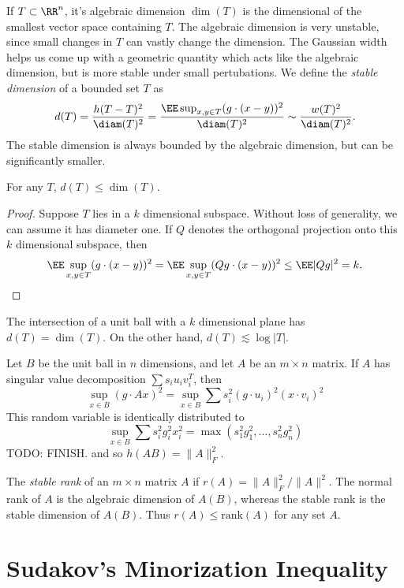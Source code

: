 If $T \subset \RR^n$, it's algebraic dimension $\dim(T)$ is the dimensional of the smallest vector space containing $T$. The algebraic dimension is very unstable, since small changes in $T$ can vastly change the dimension. The Gaussian width helps us come up with a geometric quantity which acts like the algebraic dimension, but is more stable under small pertubations. We define the {\it stable dimension} of a bounded set $T$ as
%
\[ d(T) = \frac{h(T-T)^2}{\diam(T)^2} = \frac{\EE \sup_{x,y \in T} (g \cdot (x - y))^2}{\diam(T)^2} \sim \frac{w(T)^2}{\diam(T)^2}. \]
%
The stable dimension is always bounded by the algebraic dimension, but can be significantly smaller.

\begin{lemma}
	For any $T$, $d(T) \leq \dim(T)$.
\end{lemma}
\begin{proof}
	Suppose $T$ lies in a $k$ dimensional subspace. Without loss of generality, we can assume it has diameter one. If $Q$ denotes the orthogonal projection onto this $k$ dimensional subspace, then
	\[ \EE \sup_{x,y \in T} (g \cdot (x-y))^2 = \EE \sup_{x,y \in T} (Qg \cdot (x-y))^2 \leq \EE |Qg|^2 = k. \]
\end{proof}

The intersection of a unit ball with a $k$ dimensional plane has $d(T) = \dim(T)$. On the other hand, $d(T) \lesssim \log |T|$.

\begin{example}
	Let $B$ be the unit ball in $n$ dimensions, and let $A$ be an $m \times n$ matrix. If $A$ has singular value decomposition $\sum s_i u_i v_i^T$, then
	\[ \sup_{x \in B} (g \cdot Ax)^2 = \sup_{x \in B} \sum s_i^2 (g \cdot u_i)^2 (x \cdot v_i)^2 \]
	This random variable is identically distributed to
	\[ \sup_{x \in B} \sum s_i^2 g_i^2 x_i^2 = \max(s_1^2g_1^2, \dots, s_n^2g_n^2) \]
	TODO: FINISH. and so $h(AB) = \| A \|_F^2$.
\end{example}

The {\it stable rank} of an $m \times n$ matrix $A$ if $r(A) = \| A \|_F^2 / \| A \|^2$. The normal rank of $A$ is the algebraic dimension of $A(B)$, whereas the stable rank is the stable dimension of $A(B)$. Thus $r(A) \leq \text{rank}(A)$ for any set $A$.

\section{Sudakov's Minorization Inequality}

